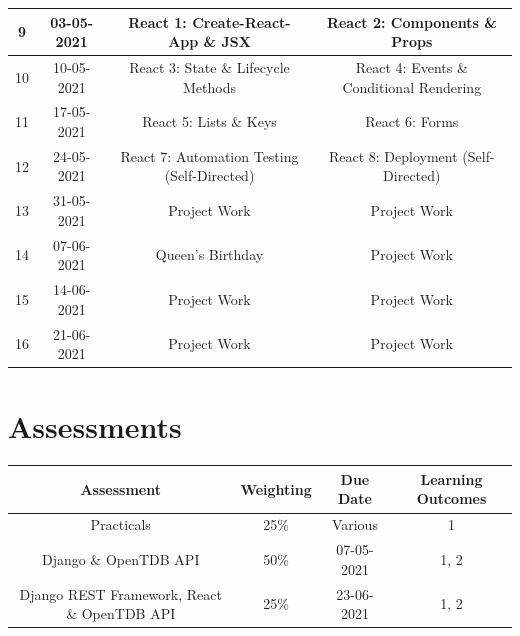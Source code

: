 \documentclass{article}
\begin{document}
\begin{tabular}{|c|c|c|c|}
	\small 9      & 03-05-2021        & \small React 1: Create-React-App \& JSX               & \small React 2: Components \& Props                   \\ \hline
	\small 10     & 10-05-2021        & \small React 3: State \& Lifecycle Methods   & \small React 4: Events \& Conditional Rendering                             \\ \hline
	\small 11     & \small 17-05-2021 & \small React 5:  Lists \& Keys                             & \small  React 6: Forms                          \\ \hline                                           
	\small 12     & \small 24-05-2021 & \small React 7: Automation Testing (Self-Directed)                       & \small React 8:  Deployment (Self-Directed)                                       \\ \hline
	\small 13     & \small 31-05-2021 & \small Project Work                               & \small Project Work                                         \\ \hline
	\small 14     & \small 07-06-2021 & \cellcolor{yellow} \small Queen's Birthday        & \small Project Work                                         \\ \hline
	\small 15     & \small 14-06-2021 & \small Project Work                               & \small Project Work                                         \\ \hline
	\small 16     & \small 21-06-2021 & \small Project Work                               & \small Project Work                                         \\ \hline
\end{tabular}

\section*{Assessments}
\renewcommand{\arraystretch}{1.5}
\begin{tabular}{|c|c|c|c|}
	\hline
	\textbf{Assessment}                                & \textbf{Weighting} & \textbf{Due Date} & \textbf{Learning Outcomes} \\ \hline 
	\small Practicals                                  & \small 25\%        & \small Various & \small 1                   \\ \hline
	\small Django \& OpenTDB API                       & \small 50\%        & \small 07-05-2021 & \small 1, 2                \\ \hline
	\small Django REST Framework, React \& OpenTDB API & \small 25\%        & \small 23-06-2021 & \small 1, 2                \\ \hline
\end{tabular}
\end{document}

